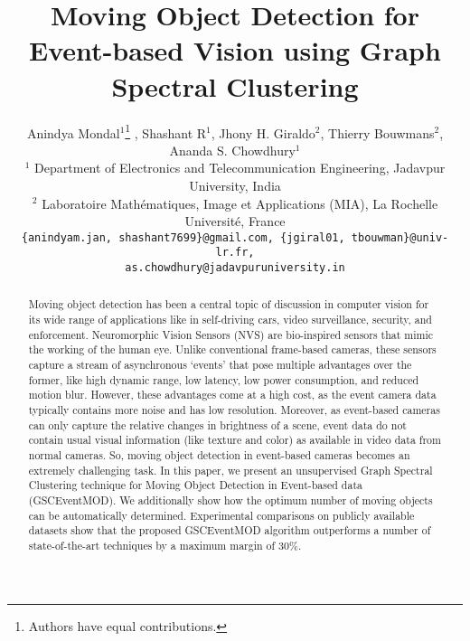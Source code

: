 \documentclass{article}
\title{Moving Object Detection for Event-based Vision using Graph Spectral Clustering}
\author{Anindya Mondal$^1$\thanks{Authors have equal contributions.} , Shashant R$^1$\footnotemark[1] , Jhony H. Giraldo$^2$, Thierry Bouwmans$^2$, Ananda S. Chowdhury$^1$ \\
$^1$ Department of Electronics and Telecommunication Engineering, Jadavpur University, India\\
$^2$ 
Laboratoire Mathématiques, Image et Applications (MIA), La Rochelle Université, France \\
{\tt\small \{anindyam.jan, shashant7699\}@gmail.com, \{jgiral01, tbouwman\}@univ-lr.fr,} \\
{\tt\small as.chowdhury@jadavpuruniversity.in}}
\date{}
\begin{document}
\maketitle

\begin{abstract}
	Moving object detection has been a central topic of discussion in computer vision for its wide range of applications like in self-driving cars, video surveillance, security, and enforcement. Neuromorphic Vision Sensors (NVS) are bio-inspired sensors that mimic the working of the human eye. Unlike conventional frame-based cameras, these sensors capture a stream of asynchronous ‘events’ that pose multiple advantages over the former, like high dynamic range, low latency, low power consumption, and reduced motion blur. However, these advantages come at a high cost, as the event camera data typically contains more noise and has low resolution. Moreover, as event-based cameras can only capture the relative changes in brightness of a scene, event data do not contain usual visual information (like texture and color) as available in video data from normal cameras. So, moving object detection in event-based cameras becomes an extremely challenging task. In this paper, we present an unsupervised Graph Spectral Clustering technique for Moving Object Detection in Event-based data (GSCEventMOD). We additionally show how the optimum number of moving objects can be automatically determined. Experimental comparisons on publicly available datasets show that the proposed GSCEventMOD algorithm outperforms a number of state-of-the-art techniques by a maximum margin of 30$\%$. 
\end{abstract}


\end{document}
